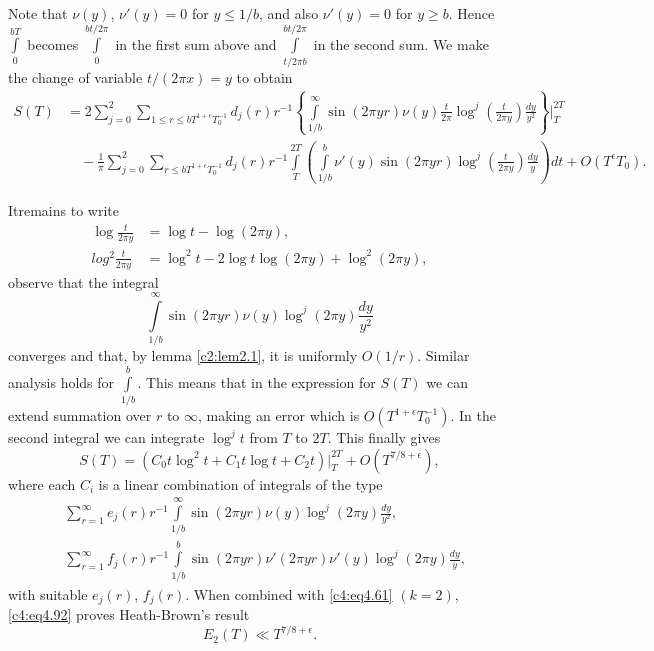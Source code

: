 Note that $\nu (y)$, $\nu'(y)=0$ for $y \leq 1/b$, and also
$\nu'(y)=0$ for $y \geq b$. Hence $\int\limits_0^{bT}$ becomes
$\int\limits_0^{bt/2\pi}$ in the first sum above and $\int\limits_{t/2
\pi b}^{bt/2\pi}$ in the second sum. We make the change of variable
$t/(2 \pi x)=y$ to obtain
{\fontsize{9}{11}\selectfont
\begin{align*}
  S(T) & = 2 \sum_{j=0}^2 \sum_{1 \leq r \leq bT^{1+
      \epsilon}T_0^{-1}} d_j(r) r^{-1} \left\{\int\limits_{1/b}^\infty
  \sin (2 \pi yr) \nu (y) \frac{t}{2\pi} \log^j \left(\frac{t}{2\pi y}
  \right) \frac{dy}{y^2} \right\}\Bigg|_T^{2T}\\
  &\quad - \frac{1}{\pi} \sum_{j=0}^2 \sum_{r \leq bT^{1+\epsilon}T_0^{-1}}
  d_j (r) r^{-1} \int\limits_T^{2T}
  \left(\int\limits_{1/b}^{b} \nu'
  (y) \sin(2 \pi yr) \log^j \left(\frac{t}{2 \pi y} \right)
  \frac{dy}{y}\right)dt +  O(T^\epsilon T_0).
\end{align*}}

It\pageoriginale remains to write
\begin{align*}
  \log \frac{t}{2 \pi y} & = \log t - \log (2 \pi y),\\
  log^2 \frac{t}{2 \pi y} & = \log^2 t - 2 \log t \log (2 \pi y) +
  \log^2 (2 \pi y),
\end{align*}
observe that the integral
$$
\int\limits_{1/b}^\infty \sin (2 \pi y r) \nu (y) \log^j (2 \pi y)
\frac{dy}{y^2} 
$$
converges and that, by lemma \ref{c2:lem2.1}, it is uniformly
$O(1/r)$. Similar analysis holds for $\int\limits_{1/b}^b$. This
means that in the expression for $S(T)$ we can extend summation over
$r$ to $\infty$, making an error which is $O(T^{1+\epsilon}
T_0^{-1})$. In the second integral we can integrate $\log^j t$ from
$T$ to $2T$. This finally gives
\begin{equation}
  \label{c4:eq4.92}
  S(T) = \left(C_0 t \log ^2 t+ C_1 t \log  t+ C_2 t\right) \Bigg|_T^{2T} +
  O(T^{7/8+\epsilon}), 
\end{equation}
where each $C_i$ is a linear combination of integrals of the type
\begin{align*}
  & \sum_{r=1}^\infty e_j (r) r^{-1} \int\limits_{1/b}^\infty \sin (2
  \pi y r) \nu (y) \log^j (2 \pi y) \frac{dy}{y^2},\\
  & \sum_{r=1}^\infty f_j (r) r^{-1} \int\limits_{1/b}^b \sin (2\pi
  yr) \nu' (2 \pi yr) \nu' (y) \log^j (2 \pi y) \frac{dy}{y},
\end{align*}
with suitable $e_j (r)$, $f_j (r)$. When combined with
\eqref{c4:eq4.61} $(k=2)$, \eqref{c4:eq4.92} proves Heath-Brown's
result
\begin{equation}
  \label{c4:eq4.93}  E_2(T) \ll T^{7/8+\epsilon}.
\end{equation}

